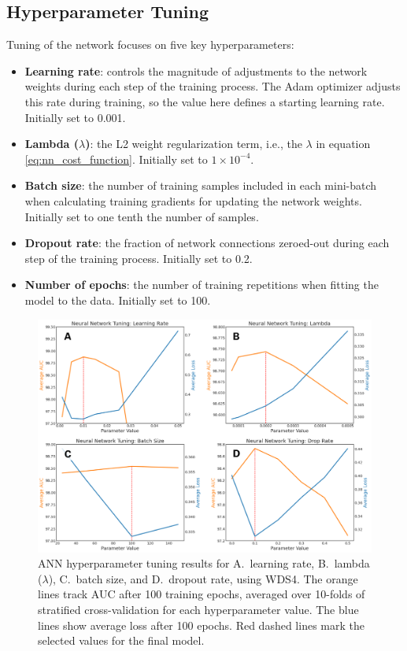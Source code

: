 \subsection{Hyperparameter Tuning}\label{ch5:ann_tuning}

Tuning of the network focuses on five key hyperparameters:
\begin{itemize}[itemsep=2pt]
    \item \textbf{Learning rate}: controls the magnitude of adjustments to the network weights during each step of the training process. The Adam optimizer adjusts this rate during training, so the value here defines a starting learning rate. Initially set to 0.001.
    \item \textbf{Lambda ($\lambda$)}: the L2 weight regularization term, i.e., the $\lambda$ in equation \ref{eq:nn_cost_function}. Initially set to $1\times10^{-4}$.
    \item \textbf{Batch size}: the number of training samples included in each mini-batch when calculating training gradients for updating the network weights. Initially set to one tenth the number of samples.
    \item \textbf{Dropout rate}: the fraction of network connections zeroed-out during each step of the training process. Initially set to 0.2.
    \item \textbf{Number of epochs}: the number of training repetitions when fitting the model to the data. Initially set to 100.
\end{itemize}

\begin{figure}[htp]
\centering
\includegraphics[width=\textwidth]{templates/images/Figure-NN_Hyperparameters.png}
\caption[Neural network hyperparameter tuning]{ANN hyperparameter tuning results for A.\ learning rate, B.\ lambda ($\lambda$), C.\ batch size, and D.\ dropout rate, using WDS4. The orange lines track AUC after 100 training epochs, averaged over 10-folds of stratified cross-validation for each hyperparameter value. The blue lines show average loss after 100 epochs. Red dashed lines mark the selected values for the final model.}
\label{fig:nn_tuning_plots}
\end{figure}

